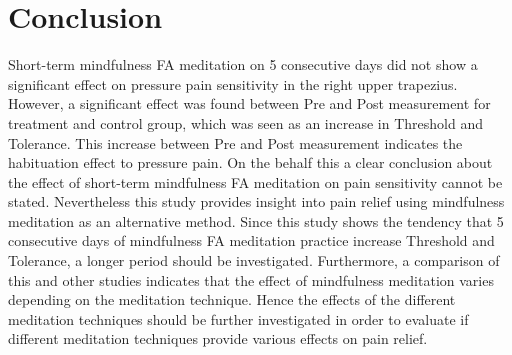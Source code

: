 \section{Conclusion}
Short-term mindfulness FA meditation on 5 consecutive days did not show a significant effect on pressure pain sensitivity in the right upper trapezius. However, a significant effect was found between Pre and Post measurement for treatment and control group, which was seen as an increase in Threshold and Tolerance. This increase between Pre and Post measurement indicates the habituation effect to pressure pain.
On the behalf this a clear conclusion about the effect of short-term mindfulness FA meditation on pain sensitivity cannot be stated. Nevertheless this study provides insight into pain relief using mindfulness meditation as an alternative method.
Since this study shows the tendency that 5 consecutive days of mindfulness FA meditation practice increase Threshold and Tolerance, a longer period should be investigated. 
Furthermore, a comparison of this and
other studies indicates that the effect of mindfulness meditation varies depending on the
meditation technique. Hence the effects of the different meditation techniques should be
further investigated in order to evaluate if different meditation techniques provide various
effects on pain relief.

